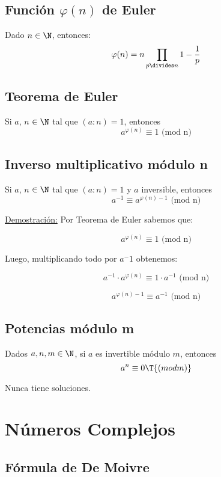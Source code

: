 \documentclass[../main.tex]{subfiles}
\begin{document}
{\subsection{Función $\varphi (n)$ de Euler} {
Dado $n \in \N$, entonces:
\begin{equation*}
    \varphi (n) = n \prod_{p \divides n}{1 - \frac{1}{p}}
\end{equation*}
}

\subsection{Teorema de Euler} {
Si $a$, $n$ $\in \N$ tal que $(a : n) = 1$, entonces
\begin{equation*}
    a ^ {\varphi (n)} \equiv 1 \text{ (mod n)} 
\end{equation*}
}

\subsection{Inverso multiplicativo módulo n} {
Si $a$, $n$ $\in \N$ tal que $(a : n) = 1$ y $a$ inversible, entonces
\begin{equation*}
    a^{-1} \equiv a ^ {\varphi (n) -1} \text{ (mod n)} 
\end{equation*}

\ul{Demostración:} Por Teorema de Euler sabemos que:

\begin{equation*}
    a ^ {\varphi (n)} \equiv 1 \text{ (mod n)} 
\end{equation*}

Luego, multiplicando todo por $a^-1$ obtenemos:

\begin{equation*}
    a^{-1} \cdot a ^ {\varphi (n)} \equiv 1 \cdot {a^{-1}} \text{ (mod n)} 
\end{equation*}

\begin{equation*}
    a ^ {\varphi (n) -1} \equiv {a^{-1}} \text{ (mod n)} 
\end{equation*}

} \label{inverso_mod_n}

\subsection{Potencias módulo m} {
Dados $a,n,m \in \N$, si $a$ es invertible módulo $m$, entonces
\begin{equation*}
    a^n \equiv 0 \T{(mod m)}
\end{equation*}

Nunca tiene soluciones.
} \label{potencias_mod_n}

}

\section{Números Complejos} {
    \subsection{Fórmula de De Moivre} {
        
    } \label{moivre}
}
\end{document}
